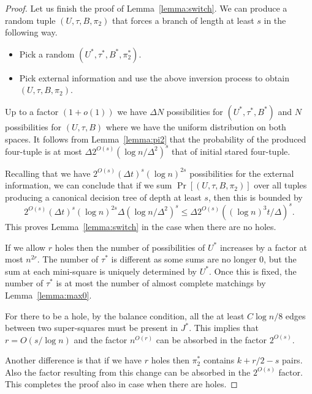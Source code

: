 \documentclass{theoretics}
\begin{document}
\begin{proof}
Let us finish the proof of Lemma~\ref{lemma:switch}.
We can produce a random
tuple $(U, \tau, B, \pi_2)$ that forces a branch
of length at least $s$ in the following way.

\begin{itemize}

\item Pick a random $(U^*, \tau^*, B^*, \pi^*_2)$.

\item Pick external information and use the above
inversion process to obtain $(U, \tau, B, \pi_2)$.

\end{itemize}

Up to a factor $(1+o(1))$ we have $\Delta N$
possibilities for $(U^*, \tau^*, B^*)$ and
$N$ possibilities for $(U, \tau, B)$ where we have
the uniform distribution on both spaces.
It follows from Lemma~\ref{lemma:pi2}
that the probability of the produced four-tuple
is at most $\Delta 2^{O(s)} (\log n/\Delta^2)^s$ that of
initial stared four-tuple.

Recalling that we have $2^{O(s)} (\Delta t)^s (\log n)^{2s}$
possibilities for the external information, 
we can conclude that if we sum
$\Pr[(U, \tau, B, \pi_2)]$ over all tuples producing
a canonical decision tree of depth at least $s$,
then this is bounded by 
$$
2^{O(s)} (\Delta t)^s (\log n)^{2s} \Delta (\log n/\Delta^2)^s
\leq  \Delta 2^{O(s)} ((\log n)^3 t/\Delta)^s.
$$
This proves Lemma~\ref{lemma:switch} in the case when there are no holes.

If we allow $r$ holes then the number of possibilities
of $U^*$ increases by a factor at most $n^{2r}$.
The number of $\tau^*$ is different as some sums are
no longer $0$, but the sum at each mini-square is
uniquely determined by $U^*$.  Once this is fixed, the 
number of $\tau^*$ is at most the number of almost
complete matchings by Lemma~\ref{lemma:max0}.

For there to be a hole, by the balance condition,
all the at least $C \log n /8$ edges between two super-squares must
be present in $J^*$.  This implies that $r= O(s/ \log n)$
and the factor $n^{O(r)}$ can be absorbed in the 
factor $2^{O(s)}$.  

Another difference is that if we have $r$ holes then
$\pi_2^*$ contains $k+r/2-s$ pairs.  Also the factor
resulting from this change can be absorbed in
the $2^{O(s)}$ factor.  This completes the proof also in
case when there are holes.
\end{proof}
\end{document}
